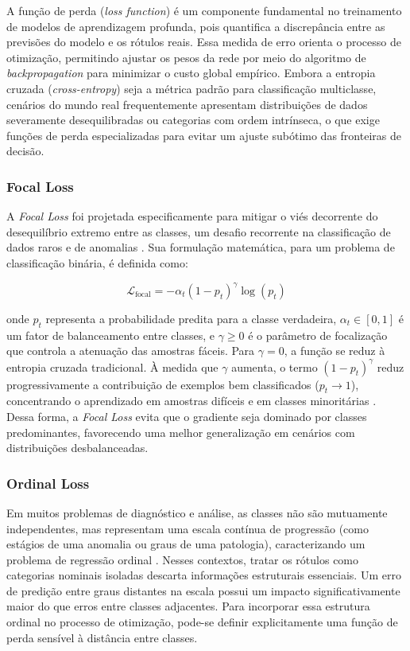 	A função de perda (\textit{loss function}) é um componente fundamental no treinamento de modelos de aprendizagem profunda, pois quantifica a discrepância entre as previsões do modelo e os rótulos reais. Essa medida de erro orienta o processo de otimização, permitindo ajustar os pesos da rede por meio do algoritmo de \textit{backpropagation} para minimizar o custo global empírico. Embora a entropia cruzada (\textit{cross-entropy}) seja a métrica padrão para classificação multiclasse, cenários do mundo real frequentemente apresentam distribuições de dados severamente desequilibradas ou categorias com ordem intrínseca, o que exige funções de perda especializadas para evitar um ajuste subótimo das fronteiras de decisão.
	
	\subsubsection{Focal Loss}	
	A \textit{Focal Loss} foi projetada especificamente para mitigar o viés decorrente do desequilíbrio extremo entre as classes, um desafio recorrente na classificação de dados raros e de anomalias \cite{focal_loss_iot}. Sua formulação matemática, para um problema de classificação binária, é definida como:
	
	\begin{equation}
		\mathcal{L}_{\text{focal}} = - \alpha_t (1 - p_t)^\gamma \log(p_t)
	\end{equation}
	
	onde $p_t$ representa a probabilidade predita para a classe verdadeira, $\alpha_t \in [0,1]$ é um fator de balanceamento entre classes, e $\gamma \geq 0$ é o parâmetro de focalização que controla a atenuação das amostras fáceis. Para $\gamma = 0$, a função se reduz à entropia cruzada tradicional. À medida que $\gamma$ aumenta, o termo $(1 - p_t)^\gamma$ reduz progressivamente a contribuição de exemplos bem classificados ($p_t \to 1$), concentrando o aprendizado em amostras difíceis e em classes minoritárias \cite{focal_loss_liver}. Dessa forma, a \textit{Focal Loss} evita que o gradiente seja dominado por classes predominantes, favorecendo uma melhor generalização em cenários com distribuições desbalanceadas.
	
	
\subsubsection{Ordinal Loss}
\label{subsub:ordinal-loss}	
Em muitos problemas de diagnóstico e análise, as classes não são mutuamente independentes, mas representam uma escala contínua de progressão (como estágios de uma anomalia ou graus de uma patologia), caracterizando um problema de regressão ordinal \cite{imbalanced_ordinal_nn}. Nesses contextos, tratar os rótulos como categorias nominais isoladas descarta informações estruturais essenciais. Um erro de predição entre graus distantes na escala possui um impacto significativamente maior do que erros entre classes adjacentes. Para incorporar essa estrutura ordinal no processo de otimização, pode-se definir explicitamente uma função de perda sensível à distância entre classes.


